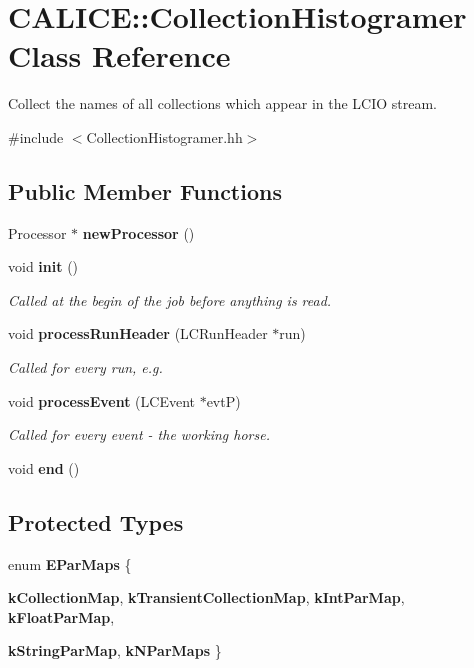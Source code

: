 \section{CALICE::CollectionHistogramer Class Reference}
\label{classCALICE_1_1CollectionHistogramer}


Collect the names of all collections which appear in the LCIO stream.  


{\ttfamily \#include $<$CollectionHistogramer.hh$>$}\subsection*{Public Member Functions}
\begin{DoxyCompactItemize}
\item 
Processor $\ast$ {\bfseries newProcessor} ()\label{classCALICE_1_1CollectionHistogramer_ab0f528c9dbae6df5c5daad1c4a79fdce}

\item 
void {\bf init} ()
\begin{DoxyCompactList}\small\item\em Called at the begin of the job before anything is read. \item\end{DoxyCompactList}\item 
void {\bf processRunHeader} (LCRunHeader $\ast$run)
\begin{DoxyCompactList}\small\item\em Called for every run, e.g. \item\end{DoxyCompactList}\item 
void {\bf processEvent} (LCEvent $\ast$evtP)\label{classCALICE_1_1CollectionHistogramer_a35914ac7c3eb21bcb71c09ca1ae011f5}

\begin{DoxyCompactList}\small\item\em Called for every event -\/ the working horse. \item\end{DoxyCompactList}\item 
void {\bfseries end} ()\label{classCALICE_1_1CollectionHistogramer_a59fc5c8e1e396b6bd4268549181b2035}

\end{DoxyCompactItemize}
\subsection*{Protected Types}
\begin{DoxyCompactItemize}
\item 
enum {\bf EParMaps} \{ \par
{\bf kCollectionMap}, 
{\bf kTransientCollectionMap}, 
{\bf kIntParMap}, 
{\bf kFloatParMap}, 
\par
{\bf kStringParMap}, 
{\bfseries kNParMaps}
 \}
\end{DoxyCompactItemize}
